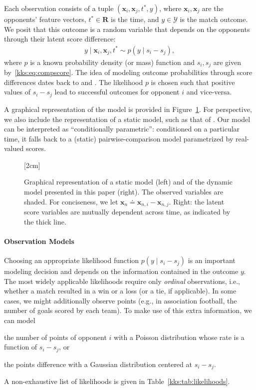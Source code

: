Each observation consists of a tuple $(\bm{x}_i, \bm{x}_j, t^*, y)$, where $\bm{x}_i, \bm{x}_j$ are the opponents' feature vectors, $t^* \in \mathbf{R}$ is the time, and $y \in \mathcal{Y}$ is the match outcome.
We posit that this outcome is a random variable that depends on the opponents through their latent score difference:
\begin{align*}
	y \mid \bm{x}_i, \bm{x}_j, t^* \sim p( y \mid s_i - s_j ),
\end{align*}
where $p$ is a known probability density (or mass) function and $s_i, s_j$ are given by~\eqref{kks:eq:compscore}.
The idea of modeling outcome probabilities through score differences dates back to \citet{thurstone1927law} and \citet{zermelo1928berechnung}.
The likelihood $p$ is chosen such that positive values of $s_i - s_j$ lead to successful outcomes for opponent $i$ and vice-versa.

A graphical representation of the model is provided in Figure~\ref{kks:fig:pgms}.
For perspective, we also include the representation of a static model, such as that of \citet{thurstone1927law}.
Our model can be interpreted as ``conditionally parametric'': conditioned on a particular time, it falls back to a (static) pairwise-comparison model parametrized by real-valued scores.

\begin{figure}[t]
	[2cm]{
		
	}
	\hfill
	\caption{
		Graphical representation of a static model (left) and of the dynamic model presented in this paper (right).
		The observed variables are shaded.
		For conciseness, we let $\bm{x}_n \doteq \bm{x}_{n,i} - \bm{x}_{n,j}$.
		Right: the latent score variables are mutually dependent across time, as indicated by the thick line.}
	\label{kks:fig:pgms}
\end{figure}

\paragraph{Observation Models}
Choosing an appropriate likelihood function $p(y \mid s_i - s_j)$ is an important modeling decision and depends on the information contained in the outcome $y$.
The most widely applicable likelihoods require only \emph{ordinal} observations, i.e., whether a match resulted in a win or a loss (or a tie, if applicable).
In some cases, we might additionally observe points (e.g., in association football, the number of goals scored by each team).
To make use of this extra information, we can model
\begin{enuminline}
	\item the number of points of opponent $i$ with a Poisson distribution whose rate is a function of $s_i - s_j$, or
	\item the points difference with a Gaussian distribution centered at $s_i - s_j$.
\end{enuminline}
A non-exhaustive list of likelihoods is given in Table~\ref{kks:tab:likelihoods}.


